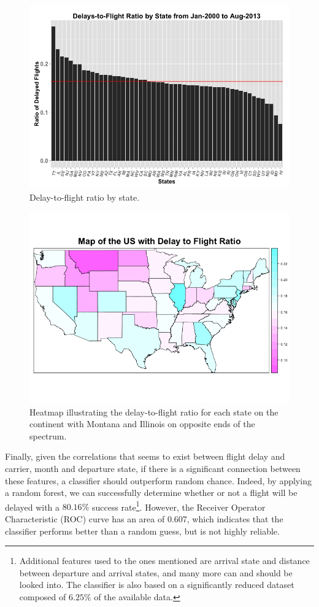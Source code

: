 \documentclass[11pt,twoside,titlepage]{article}
\begin{document}
\begin{figure}[h!]
        \centering
                \includegraphics[width=17cm]{Delays_by_State2.png}
        \caption{Delay-to-flight ratio by state.}\label{fig:Delays by State as Percentage}
\end{figure}

\begin{figure}[h!]
        \centering
                \includegraphics[width=14cm]{USMap2.png}
        \caption{Heatmap illustrating the delay-to-flight ratio for each state on the continent with Montana and Illinois on opposite ends of the spectrum.}\label{fig:USMap2}
\end{figure}

Finally, given the correlations that seems to exist between flight delay and carrier, month and departure state, if there is a significant connection between these features, a classifier should outperform random chance. Indeed, by applying a random forest, we can successfully determine whether or not a flight will be delayed with a $80.16\%$ success rate\footnote{Additional features used to the ones mentioned are arrival state and distance between departure and arrival states, and many more can and should be looked into. The classifier is also based on a significantly reduced dataset composed of $6.25\%$ of the available data.}. However, the Receiver Operator Characteristic (ROC) curve has an area of 0.607, which indicates that the classifier performs better than a random guess, but is not highly reliable.
\end{document}
